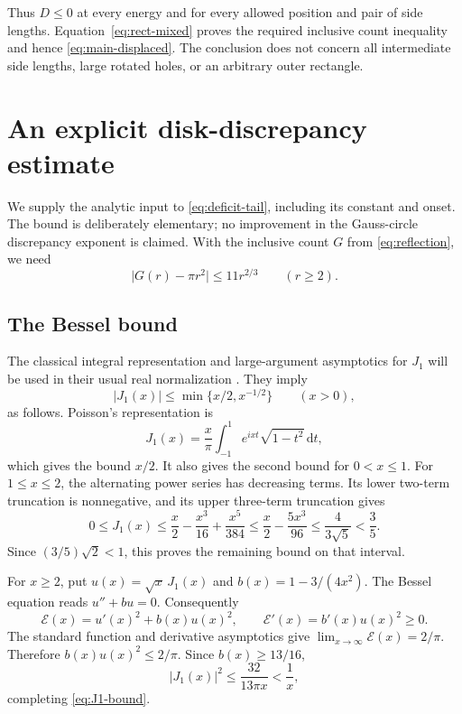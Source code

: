 \documentclass[11pt,reqno]{amsart}
\numberwithin{equation}{section}
\newcommand{\dd}{\,\mathrm d}
\newcommand{\abs}[1]{\lvert#1\rvert}
\begin{document}
Thus $D\le0$ at every energy and for every allowed position
and pair of side lengths. Equation~\eqref{eq:rect-mixed}
proves the required inclusive count inequality and hence
\eqref{eq:main-displaced}. The conclusion does not concern
all intermediate side lengths,
large rotated holes, or an arbitrary outer rectangle.

\appendix
\section{An explicit disk-discrepancy estimate}\label{app:circle}

We supply the analytic input to \eqref{eq:deficit-tail}, including
its constant and onset. The bound is deliberately elementary;
no improvement in the Gauss-circle discrepancy exponent is claimed.
With the inclusive count $G$ from \eqref{eq:reflection}, we need
\begin{equation}\label{eq:gauss}
 \abs{G(r)-\pi r^2}\le11r^{2/3}\qquad(r\ge2).
\end{equation}

\subsection*{The Bessel bound}

The classical integral representation and large-argument
asymptotics for $J_1$ will be used in their usual real
normalization \cite[\S\S10.9, 10.17]{DLMF}. They imply
\begin{equation}\label{eq:J1-bound}
 \abs{J_1(x)}\le\min\{x/2,x^{-1/2}\}\qquad(x>0),
\end{equation}
as follows. Poisson's representation is
\[
 J_1(x)=\frac{x}{\pi}\int_{-1}^{1}e^{ixt}\sqrt{1-t^2}\dd t,
\]
which gives the bound $x/2$. It also gives the second bound
for $0<x\le1$. For $1\le x\le2$, the alternating power
series has decreasing terms. Its lower two-term truncation
is nonnegative, and its upper three-term truncation gives
\[
 0\le J_1(x)\le\frac x2-\frac{x^3}{16}+\frac{x^5}{384}
 \le\frac x2-\frac{5x^3}{96}
 \le\frac4{3\sqrt5}<\frac35.
\]
Since $(3/5)\sqrt2<1$, this proves the remaining bound on
that interval.

For $x\ge2$, put $u(x)=\sqrt x\,J_1(x)$ and
$b(x)=1-3/(4x^2)$. The Bessel equation reads $u''+bu=0$.
Consequently
\[
 \mathcal E(x)=u'(x)^2+b(x)u(x)^2,
 \qquad\mathcal E'(x)=b'(x)u(x)^2\ge0.
\]
The standard function and derivative asymptotics give
$\lim_{x\to\infty}\mathcal E(x)=2/\pi$. Therefore
$b(x)u(x)^2\le2/\pi$. Since $b(x)\ge13/16$,
\[
 \abs{J_1(x)}^2\le\frac{32}{13\pi x}<\frac1x,
\]
completing \eqref{eq:J1-bound}.
\end{document}
